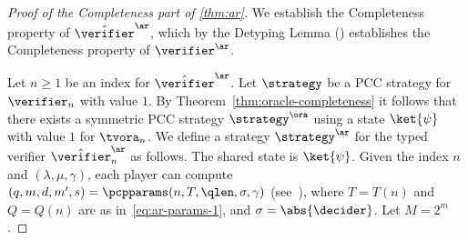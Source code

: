\begin{proof}[Proof of the Completeness part of \cref{thm:ar}]
We establish the Completeness property of $\tvans$, which by the Detyping
  Lemma () establishes the Completeness property of
  $\vans$.

  Let $n\geq 1$ be an index for $\tvans$.
  Let $\strategy$ be a PCC strategy for $\verifier_n$ with value $1$.
  By Theorem~\ref{thm:oracle-completeness} it follows that there exists a
  symmetric PCC strategy $\strategy^\ora$ using a state $\ket{\psi}$ with value
  $1$ for $\tvora_n$.
  We define a strategy $\strategy^\ar$ for the typed verifier $\tvans_n$ as
  follows.
  The shared state is $\ket{\psi}$.
  Given the index $n$ and $(\lambda,\mu,\gamma)$, each player can compute
  $(q,m,d,m',s) = \pcpparams(n, T, \qlen,\sigma,\gamma)$
  (see~), where $T=T(n)$ and $Q=Q(n)$ are as
  in~\eqref{eq:ar-params-1}, and $\sigma = \abs{\decider}$.
  Let $M = 2^m$.


\end{proof}
